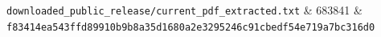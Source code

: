 \documentclass[10pt,a4paper]{article}
\begin{document}
{\begin{longtable}[]
\texttt{d\allowbreak{}o\allowbreak{}w\allowbreak{}n\allowbreak{}l\allowbreak{}o\allowbreak{}a\allowbreak{}d\allowbreak{}e\allowbreak{}d\allowbreak{}\_\allowbreak{}p\allowbreak{}u\allowbreak{}b\allowbreak{}l\allowbreak{}i\allowbreak{}c\allowbreak{}\_\allowbreak{}r\allowbreak{}e\allowbreak{}l\allowbreak{}e\allowbreak{}a\allowbreak{}s\allowbreak{}e\allowbreak{}/\allowbreak{}c\allowbreak{}u\allowbreak{}r\allowbreak{}r\allowbreak{}e\allowbreak{}n\allowbreak{}t\allowbreak{}\_\allowbreak{}p\allowbreak{}d\allowbreak{}f\allowbreak{}\_\allowbreak{}e\allowbreak{}x\allowbreak{}t\allowbreak{}r\allowbreak{}a\allowbreak{}c\allowbreak{}t\allowbreak{}e\allowbreak{}d\allowbreak{}.\allowbreak{}t\allowbreak{}x\allowbreak{}t} & {}683841 & \texttt{f\allowbreak{}8\allowbreak{}3\allowbreak{}4\allowbreak{}1\allowbreak{}4\allowbreak{}e\allowbreak{}a\allowbreak{}5\allowbreak{}4\allowbreak{}3\allowbreak{}f\allowbreak{}f\allowbreak{}d\allowbreak{}8\allowbreak{}9\allowbreak{}9\allowbreak{}1\allowbreak{}0\allowbreak{}b\allowbreak{}9\allowbreak{}b\allowbreak{}8\allowbreak{}a\allowbreak{}3\allowbreak{}5\allowbreak{}d\allowbreak{}1\allowbreak{}6\allowbreak{}8\allowbreak{}0\allowbreak{}a\allowbreak{}2\allowbreak{}e\allowbreak{}3\allowbreak{}2\allowbreak{}9\allowbreak{}5\allowbreak{}2\allowbreak{}4\allowbreak{}6\allowbreak{}c\allowbreak{}9\allowbreak{}1\allowbreak{}c\allowbreak{}b\allowbreak{}e\allowbreak{}d\allowbreak{}f\allowbreak{}5\allowbreak{}4\allowbreak{}e\allowbreak{}7\allowbreak{}1\allowbreak{}9\allowbreak{}a\allowbreak{}7\allowbreak{}b\allowbreak{}c\allowbreak{}3\allowbreak{}1\allowbreak{}6\allowbreak{}d\allowbreak{}0} \\

\end{longtable}}
\end{document}
